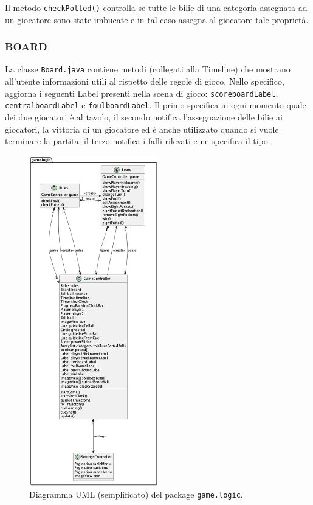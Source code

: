 \documentclass[12pt,a4paper]{report}
\begin{document}
\vspace{3mm}

Il metodo \texttt{checkPotted()} controlla se tutte le bilie di una categoria assegnata ad un giocatore sono state imbucate e in tal caso assegna al giocatore tale proprietà.

\subsubsection*{BOARD}
La classe \texttt{Board.java} contiene metodi (collegati alla Timeline) che mostrano all'utente informazioni utili al rispetto delle regole di gioco.
Nello specifico, aggiorna i seguenti Label presenti nella scena di gioco: \texttt{scoreboardLabel}, \texttt{centralboardLabel} e \texttt{foulboardLabel}.
Il primo specifica in ogni momento quale dei due giocatori è al tavolo, il secondo notifica l'assegnazione delle bilie ai giocatori, la vittoria di un giocatore ed è anche utilizzato quando si vuole terminare la partita; il terzo notifica i falli rilevati e ne specifica il tipo.

\begin{figure}
	\center
	\includegraphics[width=0.5\textwidth]{logic.png}
	\caption{Diagramma UML (semplificato) del package \texttt{game.logic}.}
\end{figure}
\end{document}
